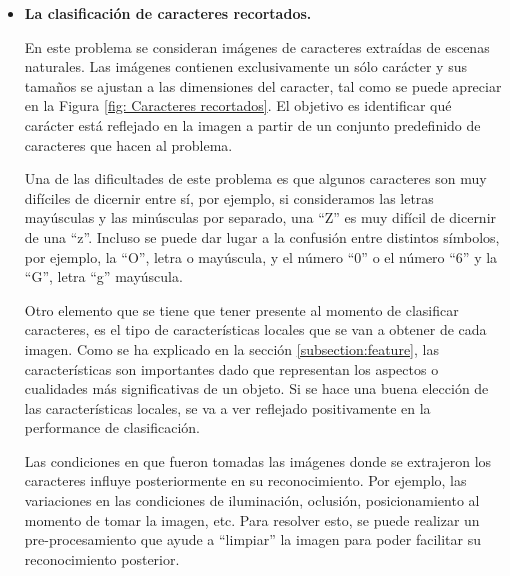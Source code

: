 	\begin{itemize}
		\item \textbf{La clasificación de caracteres recortados.}
		
		En este problema se consideran imágenes de caracteres extraídas de escenas naturales. Las imágenes contienen exclusivamente un sólo carácter y sus tamaños se ajustan a las dimensiones del caracter, tal como se puede apreciar en la Figura \ref{fig: Caracteres recortados}. El objetivo es identificar qué carácter está reflejado en la imagen a partir de un conjunto predefinido de caracteres que hacen al problema.

		Una de las dificultades de este problema es que algunos caracteres son muy difíciles de dicernir entre sí, por ejemplo, si consideramos las letras mayúsculas y las minúsculas por separado, una ``Z'' es muy difícil de dicernir de una ``z''. Incluso se puede dar lugar a la confusión entre distintos símbolos, por ejemplo, la ``O'', letra o mayúscula, y el número ``0'' o el número ``6'' y la ``G'', letra ``g'' mayúscula.
						
		Otro elemento que se tiene que tener presente al momento de clasificar caracteres, es el tipo de características locales que se van a obtener de cada imagen. Como se ha explicado en la sección \ref{subsection:feature}, las características son importantes dado que representan los aspectos o cualidades más significativas de un objeto. Si se hace una buena elección de las características locales, se va a ver reflejado positivamente en la performance de clasificación.
		
		Las condiciones en que fueron tomadas las imágenes donde se extrajeron los caracteres influye posteriormente en su reconocimiento. Por ejemplo, las variaciones en las condiciones de iluminación, oclusión, posicionamiento al momento de tomar la imagen, etc. Para resolver esto, se puede realizar un pre-procesamiento que ayude a ``limpiar'' la imagen para poder facilitar su reconocimiento posterior.
		

\end{itemize}
